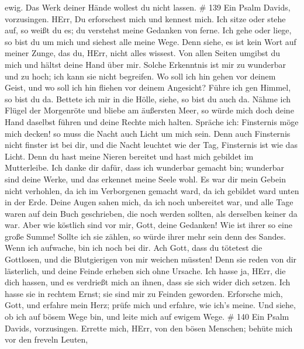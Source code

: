 ewig. Das Werk deiner Hände wollest du nicht lassen. \# 139 
Ein Psalm Davids, vorzusingen. HErr, Du erforschest mich und kennest
mich.  Ich sitze oder stehe auf, so weißt du es; du
verstehst meine Gedanken von ferne.  Ich gehe oder liege, so
bist du um mich und siehest alle meine Wege.  Denn siehe, es
ist kein Wort auf meiner Zunge, das du, HErr, nicht alles wissest.
 Von allen Seiten umgibst du mich und hältst deine Hand über
mir.  Solche Erkenntnis ist mir zu wunderbar und zu hoch;
ich kann sie nicht begreifen.  Wo soll ich hin gehen vor
deinem Geist, und wo soll ich hin fliehen vor deinem Angesicht?
 Führe ich gen Himmel, so bist du da. Bettete ich mir in die
Hölle, siehe, so bist du auch da.  Nähme ich Flügel der
Morgenröte und bliebe am äußersten Meer,  so würde mich
doch deine Hand daselbst führen und deine Rechte mich halten.
 Spräche ich: Finsternis möge mich decken! so muss die
Nacht auch Licht um mich sein.  Denn auch Finsternis nicht
finster ist bei dir, und die Nacht leuchtet wie der Tag, Finsternis ist
wie das Licht.  Denn du hast meine Nieren bereitet und hast
mich gebildet im Mutterleibe.  Ich danke dir dafür, dass
ich wunderbar gemacht bin; wunderbar sind deine Werke, und das erkennet
meine Seele wohl.  Es war dir mein Gebein nicht verhohlen,
da ich im Verborgenen gemacht ward, da ich gebildet ward unten in der
Erde.  Deine Augen sahen mich, da ich noch unbereitet war,
und alle Tage waren auf dein Buch geschrieben, die noch werden sollten,
als derselben keiner da war.  Aber wie köstlich sind vor
mir, Gott, deine Gedanken! Wie ist ihrer so eine große Summe!
 Sollte ich sie zählen, so würde ihrer mehr sein denn des
Sandes. Wenn ich aufwache, bin ich noch bei dir.  Ach Gott,
dass du tötetest die Gottlosen, und die Blutgierigen von mir weichen
müssten!  Denn sie reden von dir lästerlich, und deine
Feinde erheben sich ohne Ursache.  Ich hasse ja, HErr, die
dich hassen, und es verdrießt mich an ihnen, dass sie sich wider dich
setzen.  Ich hasse sie in rechtem Ernst; sie sind mir zu
Feinden geworden.  Erforsche mich, Gott, und erfahre mein
Herz; prüfe mich und erfahre, wie ich's meine.  Und siehe,
ob ich auf bösem Wege bin, und leite mich auf ewigem Wege. \# 140
 Ein Psalm Davids, vorzusingen.  Errette mich,
HErr, von den bösen Menschen; behüte mich vor den freveln Leuten,
